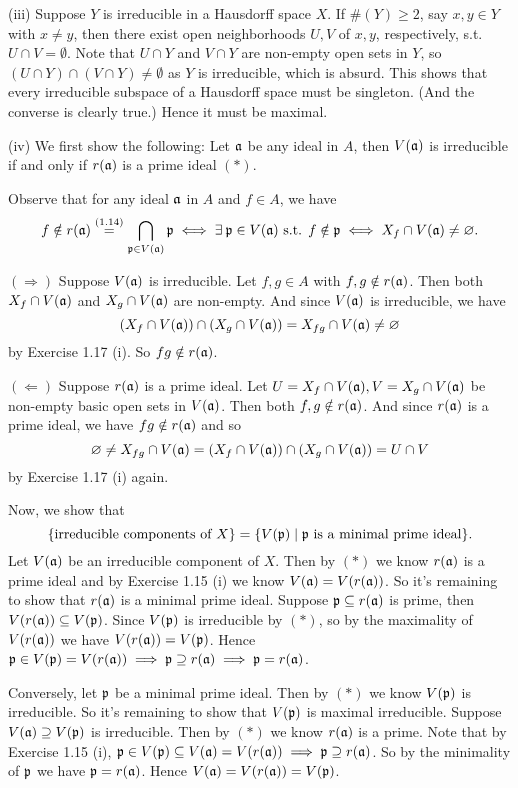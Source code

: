 \documentclass[../A&M.tex]{subfiles}
\begin{document}
(iii) Suppose $Y$ is irreducible in a Hausdorff space $X$. If $\#(Y) \geq 2$, say $x,y\in Y$ with $x\neq y$, then there exist open neighborhoods $U,V$ of $x,y$, respectively, s.t. $U \cap V = \emptyset$. Note that $U \cap Y$ and $V \cap Y$ are non-empty open sets in $Y$, so $(U \cap Y) \cap (V \cap Y) \neq \emptyset$ as $Y$ is irreducible, which is absurd. This shows that every irreducible subspace of a Hausdorff space must be singleton. (And the converse is clearly true.) Hence it must be maximal.

(iv) We first show the following: Let $\mathfrak{a}$ be any ideal in $A$, then $V(\mathfrak{a})$ is irreducible if and only if $r(\mathfrak{a})$ is a prime ideal $(*)$.

Observe that for any ideal $\mathfrak{a}$ in $A$ and $f\in A$, we have
$$
f \notin r(\afk) \overset{(1.14)}{=} \bigcap_{\pfk \in V(\afk)} \pfk
\iff \exists \pfk \in V(\afk) \text{ s.t. } f \notin \pfk
\iff X_f \cap V(\afk) \neq \emptyset.
$$

$(\Rightarrow)$ Suppose $V(\mathfrak{a})$ is irreducible. Let $f,g \in A$ with $f,g \notin r(\mathfrak{a})$. Then both $X_f \cap V(\mathfrak{a})$ and $X_g \cap V(\mathfrak{a})$ are non-empty. And since $V(\mathfrak{a})$ is irreducible, we have
$$
(X_f \cap V(\mathfrak{a})) \cap (X_g \cap V(\mathfrak{a}))
= X_{fg} \cap V(\mathfrak{a})
\neq \varnothing
$$
by Exercise 1.17 (i). So $fg \notin r(\mathfrak{a})$.

$(\Leftarrow)$ Suppose $r(\mathfrak{a})$ is a prime ideal. Let $U = X_f \cap V(\mathfrak{a}), V = X_g \cap V(\mathfrak{a})$ be non-empty basic open sets in $V(\mathfrak{a})$. Then both $f,g \notin r(\mathfrak{a})$. And since $r(\mathfrak{a})$ is a prime ideal, we have $fg \notin r(\mathfrak{a})$ and so
$$
\varnothing \neq X_{fg} \cap V(\mathfrak{a})
= (X_f \cap V(\mathfrak{a})) \cap (X_g \cap V(\mathfrak{a}))
= U \cap V
$$
by Exercise 1.17 (i) again.

Now, we show that
$$
\{\text{irreducible components of } X \} = \{ V(\mathfrak{p}) \mid \mathfrak{p} \text{ is a minimal prime ideal}\}.
$$
Let $V(\mathfrak{a})$ be an irreducible component of $X$. Then by $(*)$ we know $r(\mathfrak{a})$ is a prime ideal and by Exercise 1.15 (i) we know $V(\mathfrak{a}) = V(r(\mathfrak{a}))$. So it's remaining to show that $r(\mathfrak{a})$ is a minimal prime ideal. Suppose $\mathfrak{p} \subseteq r(\mathfrak{a})$ is prime, then $V(r(\mathfrak{a})) \subseteq V(\mathfrak{p})$. Since $V(\mathfrak{p})$ is irreducible by $(*)$, so by the maximality of $V(r(\mathfrak{a}))$ we have $V(r(\mathfrak{a})) = V(\mathfrak{p})$. Hence $\mathfrak{p} \in V(\mathfrak{p}) = V(r(\mathfrak{a})) \implies \mathfrak{p} \supseteq r(\mathfrak{a}) \implies \mathfrak{p} = r(\mathfrak{a})$.

Conversely, let $\mathfrak{p}$ be a minimal prime ideal. Then by $(*)$ we know $V(\mathfrak{p})$ is irreducible. So it's remaining to show that $V(\mathfrak{p})$ is maximal irreducible. Suppose $V(\mathfrak{a}) \supseteq V(\mathfrak{p})$ is irreducible. Then by $(*)$ we know $r(\mathfrak{a})$ is a prime. Note that by Exercise 1.15 (i), $\mathfrak{p} \in V(\mathfrak{p}) \subseteq V(\mathfrak{a}) = V(r(\mathfrak{a})) \implies \mathfrak{p} \supseteq r(\mathfrak{a})$. So by the minimality of $\mathfrak{p}$ we have $\mathfrak{p} = r(\mathfrak{a})$. Hence $V(\mathfrak{a}) = V(r(\mathfrak{a})) = V(\mathfrak{p})$.
\end{document}
